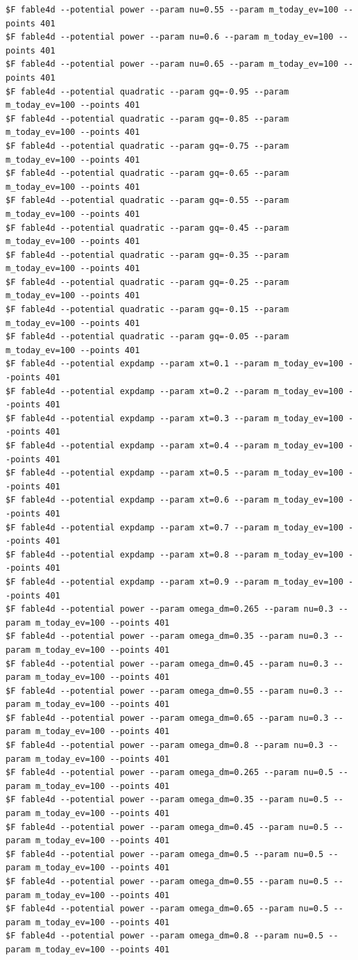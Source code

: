 \begin{Verbatim}[fontsize=\scriptsize]
$F fable4d --potential power --param nu=0.55 --param m_today_ev=100 --points 401
$F fable4d --potential power --param nu=0.6 --param m_today_ev=100 --points 401
$F fable4d --potential power --param nu=0.65 --param m_today_ev=100 --points 401
$F fable4d --potential quadratic --param gq=-0.95 --param m_today_ev=100 --points 401
$F fable4d --potential quadratic --param gq=-0.85 --param m_today_ev=100 --points 401
$F fable4d --potential quadratic --param gq=-0.75 --param m_today_ev=100 --points 401
$F fable4d --potential quadratic --param gq=-0.65 --param m_today_ev=100 --points 401
$F fable4d --potential quadratic --param gq=-0.55 --param m_today_ev=100 --points 401
$F fable4d --potential quadratic --param gq=-0.45 --param m_today_ev=100 --points 401
$F fable4d --potential quadratic --param gq=-0.35 --param m_today_ev=100 --points 401
$F fable4d --potential quadratic --param gq=-0.25 --param m_today_ev=100 --points 401
$F fable4d --potential quadratic --param gq=-0.15 --param m_today_ev=100 --points 401
$F fable4d --potential quadratic --param gq=-0.05 --param m_today_ev=100 --points 401
$F fable4d --potential expdamp --param xt=0.1 --param m_today_ev=100 --points 401
$F fable4d --potential expdamp --param xt=0.2 --param m_today_ev=100 --points 401
$F fable4d --potential expdamp --param xt=0.3 --param m_today_ev=100 --points 401
$F fable4d --potential expdamp --param xt=0.4 --param m_today_ev=100 --points 401
$F fable4d --potential expdamp --param xt=0.5 --param m_today_ev=100 --points 401
$F fable4d --potential expdamp --param xt=0.6 --param m_today_ev=100 --points 401
$F fable4d --potential expdamp --param xt=0.7 --param m_today_ev=100 --points 401
$F fable4d --potential expdamp --param xt=0.8 --param m_today_ev=100 --points 401
$F fable4d --potential expdamp --param xt=0.9 --param m_today_ev=100 --points 401
$F fable4d --potential power --param omega_dm=0.265 --param nu=0.3 --param m_today_ev=100 --points 401
$F fable4d --potential power --param omega_dm=0.35 --param nu=0.3 --param m_today_ev=100 --points 401
$F fable4d --potential power --param omega_dm=0.45 --param nu=0.3 --param m_today_ev=100 --points 401
$F fable4d --potential power --param omega_dm=0.55 --param nu=0.3 --param m_today_ev=100 --points 401
$F fable4d --potential power --param omega_dm=0.65 --param nu=0.3 --param m_today_ev=100 --points 401
$F fable4d --potential power --param omega_dm=0.8 --param nu=0.3 --param m_today_ev=100 --points 401
$F fable4d --potential power --param omega_dm=0.265 --param nu=0.5 --param m_today_ev=100 --points 401
$F fable4d --potential power --param omega_dm=0.35 --param nu=0.5 --param m_today_ev=100 --points 401
$F fable4d --potential power --param omega_dm=0.45 --param nu=0.5 --param m_today_ev=100 --points 401
$F fable4d --potential power --param omega_dm=0.5 --param nu=0.5 --param m_today_ev=100 --points 401
$F fable4d --potential power --param omega_dm=0.55 --param nu=0.5 --param m_today_ev=100 --points 401
$F fable4d --potential power --param omega_dm=0.65 --param nu=0.5 --param m_today_ev=100 --points 401
$F fable4d --potential power --param omega_dm=0.8 --param nu=0.5 --param m_today_ev=100 --points 401
\end{Verbatim}

